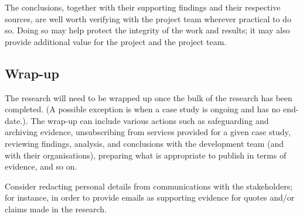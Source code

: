 The conclusions, together with their supporting findings and their respective sources, are well worth verifying with the project team wherever practical to do so. Doing so may help protect the integrity of the work and results; it may also provide additional value for the project and the project team. 

\subsection{Wrap-up}
The research will need to be wrapped up once the bulk of the research has been completed. (A possible exception is when a case study is ongoing and has no end-date.). The wrap-up can include various actions such as safeguarding and archiving evidence, unsubscribing from services provided for a given case study, reviewing findings, analysis, and conclusions with the development team (and with their organisations), preparing what is appropriate to publish in terms of evidence, and so on.

Consider redacting personal details from communications with the stakeholders; for instance, in order to provide emails as supporting evidence for quotes and/or claims made in the research. 

